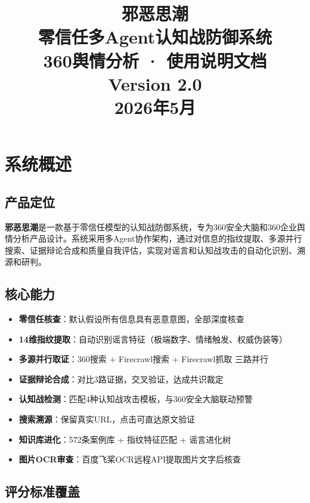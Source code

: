 \documentclass[12pt,a4paper]{ctexart}
\title{
    \vspace{2cm}
    {\Huge\bfseries 邪恶思潮}\\[0.3cm]
    {\Large 零信任多Agent认知战防御系统}\\[0.5cm]
    {\normalsize 360舆情分析 · 使用说明文档}\\[1cm]
    {\normalsize Version 2.0}\\[0.3cm]
    {\normalsize 2026年5月}
}
\author{}
\date{}
\begin{document}
\maketitle
\thispagestyle{empty}
\newpage

\tableofcontents
\newpage

\section{系统概述}

\subsection{产品定位}

\textbf{邪恶思潮}是一款基于零信任模型的认知战防御系统，专为360安全大脑和360企业舆情分析产品设计。系统采用多Agent协作架构，通过对信息的指纹提取、多源并行搜索、证据辩论合成和质量自我评估，实现对谣言和认知战攻击的自动化识别、溯源和研判。

\subsection{核心能力}

\begin{itemize}[leftmargin=*]
    \item \textbf{零信任核查}：默认假设所有信息具有恶意意图，全部深度核查
    \item \textbf{14维指纹提取}：自动识别谣言特征（极端数字、情绪触发、权威伪装等）
    \item \textbf{多源并行取证}：360搜索 + Firecrawl搜索 + Firecrawl抓取 三路并行
    \item \textbf{证据辩论合成}：对比3路证据，交叉验证，达成共识裁定
    \item \textbf{认知战检测}：匹配4种认知战攻击模板，与360安全大脑联动预警
    \item \textbf{搜索溯源}：保留真实URL，点击可直达原文验证
    \item \textbf{知识库进化}：572条案例库 + 指纹特征匹配 + 谣言进化树
    \item \textbf{图片OCR审查}：百度飞桨OCR远程API提取图片文字后核查
\end{itemize}

\subsection{评分标准覆盖}
\end{document}
